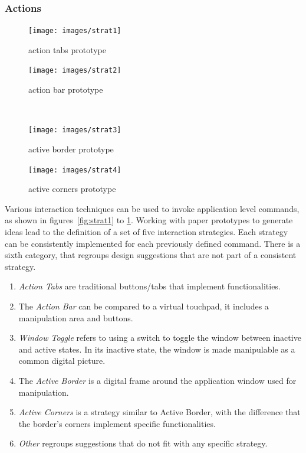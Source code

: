 \subsubsection{Actions}


\begin{figure}[ht]
\begin{minipage}[b]{0.5\linewidth}
\centering
\texttt{[image: images/strat1]}
\caption{action tabs prototype}
\label{fig:strat1}
\end{minipage}
\hspace{0.5cm}
\begin{minipage}[b]{0.5\linewidth}
\centering
\texttt{[image: images/strat2]}
\caption{action bar prototype}
\label{fig:strat2}
\end{minipage}
\hfill\\
\begin{minipage}[b]{0.5\linewidth}
\centering
\texttt{[image: images/strat3]}
\caption{active border prototype}
\label{fig:strat3}
\end{minipage}
\hspace{0.5cm}
\begin{minipage}[b]{0.5\linewidth}
\centering
\texttt{[image: images/strat4]}
\caption{active corners prototype}
\label{fig:strat4}
\end{minipage}
\end{figure}

Various interaction techniques can be used to invoke application level commands, as shown in figures~\ref{fig:strat1} to \ref{fig:strat4}.
Working with paper prototypes to generate ideas lead to the definition of a set of five interaction strategies.
Each strategy can be consistently implemented for each previously defined command.
There is a sixth category, that regroups design suggestions that are not part of a consistent strategy.

\begin{enumerate}
\item{\emph{Action Tabs} are traditional buttons/tabs that implement functionalities.}
\item{The \emph{Action Bar} can be compared to a virtual touchpad, it includes a manipulation area and buttons.}
\item{\emph{Window Toggle} refers to using a switch to toggle the window between inactive and active states. In its inactive state, the window is made manipulable as a common digital picture.}
\item{The \emph{Active Border} is a digital frame around the application window used for manipulation.}
\item{\emph{Active Corners} is a strategy similar to Active Border, with the difference that the border's corners implement specific functionalities.}
\item{\emph{Other} regroups suggestions that do not fit with any specific strategy.}
\end{enumerate}

